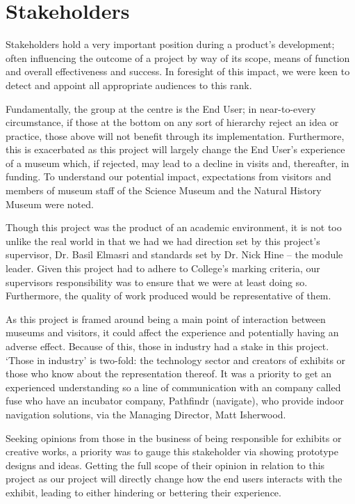 \section{Stakeholders}
Stakeholders hold a very important position during a product's development; often influencing the outcome of a project by way of its scope, means of function and overall effectiveness and success. In foresight of this impact, we were keen to detect and appoint all appropriate audiences to this rank.

Fundamentally, the group at the centre is the End User; in near-to-every circumstance, if those at the bottom on any sort of hierarchy reject an idea or practice, those above will not benefit through its implementation. Furthermore, this is exacerbated as this project will largely change the End User’s experience of a museum which, if rejected, may lead to a decline in visits and, thereafter, in funding. To understand our potential impact, expectations from visitors and members of museum staff of the Science Museum and the Natural History Museum were noted. 

Though this project was the product of an academic environment, it is not too unlike the real world in that we had we had direction set by this project’s supervisor, Dr. Basil Elmasri  and standards set by Dr. Nick Hine – the module leader. Given this project had to adhere to College's marking criteria, our supervisors responsibility was to ensure that we were at least doing so. Furthermore, the quality of work produced would be representative of them. 

As this project is framed around being a main point of interaction between museums and visitors, it could affect the experience and potentially having an adverse effect. Because of this, those in industry had a stake in this project. ‘Those in industry’ is two-fold: the technology sector and creators of exhibits or those who know about the representation thereof. It was a priority to get an experienced understanding so a line of communication with an company called fuse who have an incubator company, Pathfindr (navigate), who provide indoor navigation solutions, via the Managing Director, Matt Isherwood.

Seeking opinions from those in the business of being responsible for exhibits or creative works, a priority was to gauge this stakeholder via showing prototype designs and ideas. Getting the full scope of their opinion in relation to this project as our project will directly change how the end users interacts with the exhibit, leading to either hindering or bettering their experience. 

